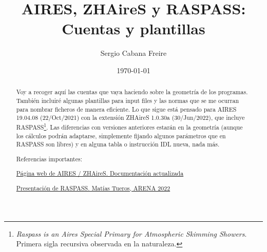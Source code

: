 \documentclass[a4paper,12pt]{article}
\title{\textbf{AIRES, ZHAireS y RASPASS: Cuentas y plantillas}}
\author{Sergio Cabana Freire}
\date{\today}
\numberwithin{equation}{section}
\numberwithin{figure}{section}
\begin{document}
   
	
	\maketitle
	\begin{abstract}
		Voy a recoger aquí las cuentas que vaya haciendo sobre la geometría de los programas. También incluiré algunas plantillas para input files y las normas que se me ocurran para nombrar ficheros de manera eficiente. Lo que sigue está pensado para AIRES 19.04.08 (22/Oct/2021) con la extensión ZHAireS 1.0.30a (30/Jun/2022), que incluye RASPASS\footnote{ \textit{Raspass is an Aires Special Primary for Atmospheric Skimming Showers}. Primera sigla recursiva observada en la naturaleza.}. Las diferencias con versiones anteriores estarán en la geometría (aunque los cálculos podrán adaptarse, simplemente fijando algunos parámetros que en RASPASS son libres) y en alguna tabla o instrucción IDL nueva, nada más.
		
		
		\vspace{10mm}
		Referencias importantes:
		
		\href{http://aires.fisica.unlp.edu.ar/}{Página web de AIRES / ZHAireS. Documentación actualizada}
		
		\href{https://indico.cern.ch/event/826366/contributions/4881703/attachments/2459764/4218361/Tueros-%20ARENA%2020222%20-%20RASPASS%20Showers.pdf}{Presentación de RASPASS. Matías Tueros, ARENA 2022}
	\end{abstract}
	\tableofcontents
	\newpage
	
\end{document}
